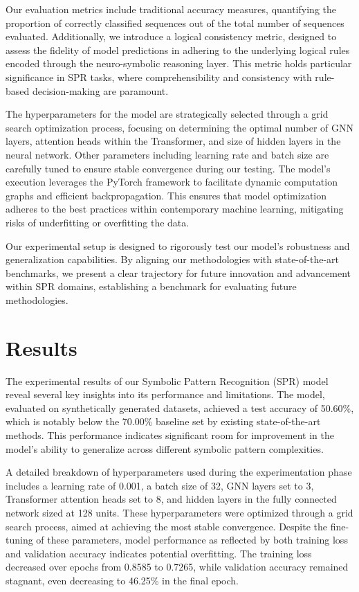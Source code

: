 \documentclass{article}
\begin{document}
Our evaluation metrics include traditional accuracy measures, quantifying the proportion of correctly classified sequences out of the total number of sequences evaluated. Additionally, we introduce a logical consistency metric, designed to assess the fidelity of model predictions in adhering to the underlying logical rules encoded through the neuro-symbolic reasoning layer. This metric holds particular significance in SPR tasks, where comprehensibility and consistency with rule-based decision-making are paramount. 

The hyperparameters for the model are strategically selected through a grid search optimization process, focusing on determining the optimal number of GNN layers, attention heads within the Transformer, and size of hidden layers in the neural network. Other parameters including learning rate and batch size are carefully tuned to ensure stable convergence during our testing. The model's execution leverages the PyTorch framework to facilitate dynamic computation graphs and efficient backpropagation. This ensures that model optimization adheres to the best practices within contemporary machine learning, mitigating risks of underfitting or overfitting the data.

Our experimental setup is designed to rigorously test our model's robustness and generalization capabilities. By aligning our methodologies with state-of-the-art benchmarks, we present a clear trajectory for future innovation and advancement within SPR domains, establishing a benchmark for evaluating future methodologies.

\section{Results}
The experimental results of our Symbolic Pattern Recognition (SPR) model reveal several key insights into its performance and limitations. The model, evaluated on synthetically generated datasets, achieved a test accuracy of 50.60\%, which is notably below the 70.00\% baseline set by existing state-of-the-art methods. This performance indicates significant room for improvement in the model's ability to generalize across different symbolic pattern complexities.

A detailed breakdown of hyperparameters used during the experimentation phase includes a learning rate of 0.001, a batch size of 32, GNN layers set to 3, Transformer attention heads set to 8, and hidden layers in the fully connected network sized at 128 units. These hyperparameters were optimized through a grid search process, aimed at achieving the most stable convergence. Despite the fine-tuning of these parameters, model performance as reflected by both training loss and validation accuracy indicates potential overfitting. The training loss decreased over epochs from 0.8585 to 0.7265, while validation accuracy remained stagnant, even decreasing to 46.25\% in the final epoch.
\end{document}
